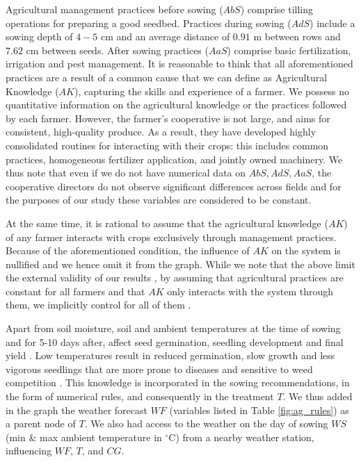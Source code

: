 \documentclass[letterpaper]{article} %
\begin{document}
Agricultural management practices before sowing ($AbS$) comprise tilling operations for preparing a good seedbed. Practices during sowing ($AdS$) include a sowing depth of $4-5$ cm and an average distance of $0.91$ m between rows and $7.62$ cm between seeds. After sowing practices ($AaS$) comprise basic fertilization, irrigation and pest management. It is reasonable to think that all aforementioned practices are a result of a common cause that we can define as Agricultural Knowledge ($AK$), capturing the skills and experience of a farmer. We possess no quantitative information on the agricultural knowledge or the practices followed by each farmer. However, the farmer's cooperative is not large, and aims for consistent, high-quality produce. As a result, they have developed highly consolidated routines for interacting with their crops: this includes common practices, homogeneous fertilizer application, and jointly owned machinery. We thus note that even if we do not have numerical data on $AbS, AdS, AaS$, the cooperative directors do not observe significant differences across fields and for the purposes of our study these variables are considered to be constant.

At the same time, it is rational to assume that the agricultural knowledge ($AK$) of any farmer interacts with crops exclusively through management practices. Because of the aforementioned condition, the influence of $AK$ on the system is nullified and we hence omit it from the graph. While we note that the above limit the external validity of our results \cite{calder1982concept}, by assuming that agricultural practices are constant for all farmers and that $AK$ only interacts with the system through them, we implicitly control for all of them \cite{huntington2021effect}.


Apart from soil moisture, soil and ambient temperatures at the time of sowing and for 5-10 days after, affect seed germination, seedling development and final yield \cite{virk2019physiological,boman2005soil,varcosoil}.
Low temperatures result in reduced germination, slow growth and less vigorous
seedlings that are more prone to diseases and sensitive to weed competition \cite{wanjura1969emergence,bradow2010germination}. This knowledge is incorporated in the sowing recommendations, in the form of numerical rules, and consequently in the treatment $T$. We thus added in the graph the weather forecast $WF$ (variables listed in Table \ref{fig:ag_rules}) as a parent node of $T$. We also had access to the weather on the day of sowing $WS$ (min \& max ambient temperature in $^\circ$C) from a nearby weather station, influencing $WF$, $T$, and $CG$.
\end{document}

